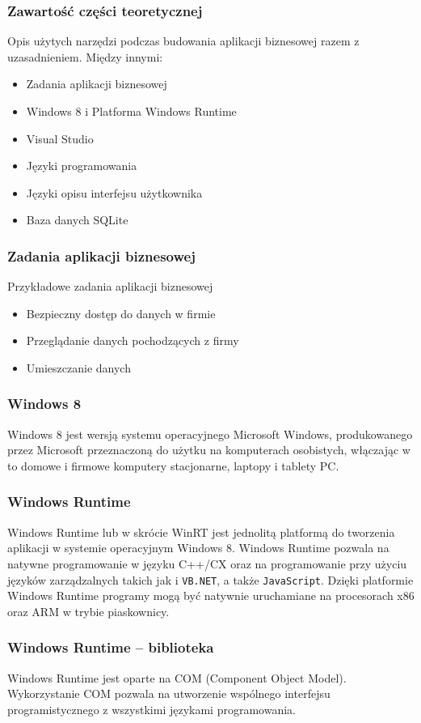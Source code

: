 \begin{frame}
\frametitle{Zawartość części teoretycznej}
Opis użytych narzędzi podczas budowania aplikacji biznesowej razem z uzasadnieniem.
Między innymi:
\begin{itemize}
\item Zadania aplikacji biznesowej
\item Windows 8 i Platforma Windows Runtime
\item Visual Studio
\item Języki programowania
\item Języki opisu interfejsu użytkownika
\item Baza danych SQLite
\end{itemize}
\end{frame}


\begin{frame}
\frametitle{Zadania aplikacji biznesowej}
Przykładowe zadania aplikacji biznesowej
\begin{itemize}
\item	Bezpieczny dostęp do danych w firmie
\item	Przeglądanie danych pochodzących z firmy
\item	Umieszczanie danych
\end{itemize}
\end{frame}

\begin{frame}
\frametitle{Windows 8}
Windows 8 jest wersją systemu operacyjnego Microsoft Windows, produkowanego przez Microsoft przeznaczoną do użytku na komputerach osobistych, włączając w to domowe i firmowe komputery stacjonarne, laptopy i tablety PC.
\end{frame}

\begin{frame}
\frametitle{Windows Runtime}
Windows Runtime lub w skrócie WinRT jest jednolitą platformą do tworzenia aplikacji w systemie operacyjnym Windows 8. Windows Runtime pozwala na natywne programowanie w języku C++/CX oraz na programowanie przy użyciu języków zarządzalnych takich jak \Csharp i \texttt{VB.NET}, a także \texttt{JavaScript}. Dzięki platformie Windows Runtime programy mogą być natywnie uruchamiane na procesorach x86 oraz ARM w trybie piaskownicy.
\end{frame}

\begin{frame}
\frametitle{Windows Runtime -- biblioteka}
Windows Runtime jest oparte na COM (Component Object Model). Wykorzystanie COM pozwala na utworzenie wspólnego interfejsu programistycznego z wszystkimi językami programowania.
\end{frame}

